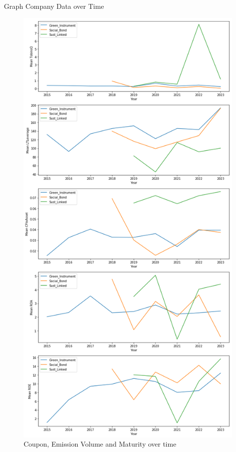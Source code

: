 \documentclass[
	8pt, %
]{beamer}
\begin{document}
\begin{frame}{Graph Company Data over Time}
    \begin{figure}[H]
    \centering
    \includegraphics[width=0.8\linewidth, height=0.8\textheight, keepaspectratio]{Company_Data_overtime.png}
    \caption{Coupon, Emission Volume and Maturity over time}
\label{fig:Metrics}
\end{figure}
\end{frame}
\end{document}

